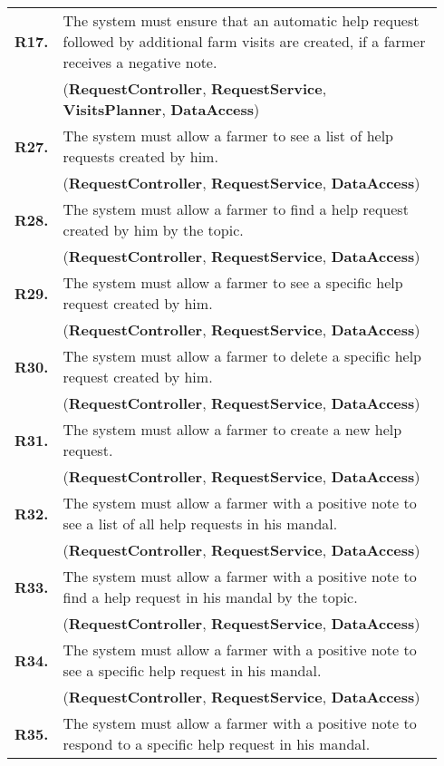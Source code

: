 \begin{longtable}{p{0.06\linewidth} p{0.88\linewidth}}
    \textbf{R17.} & The system must ensure that an automatic help request followed by additional farm visits are created, if a farmer receives a negative note.\\
    & (\textbf{RequestController}, \textbf{RequestService},
    \textbf{VisitsPlanner},
    \textbf{DataAccess})\\
	
	\textbf{R27.} & The system must allow a farmer to see a list of help requests created by him.\\
	& (\textbf{RequestController}, \textbf{RequestService}, \textbf{DataAccess})\\
	\textbf{R28.} & The system must allow a farmer to find a help request created by him by the topic.\\
	& (\textbf{RequestController}, \textbf{RequestService}, \textbf{DataAccess})\\
	\textbf{R29.} & The system must allow a farmer to see a specific help request created by him.\\
	& (\textbf{RequestController}, \textbf{RequestService}, \textbf{DataAccess})\\
	\textbf{R30.} & The system must allow a farmer to delete a specific help request created by him.\\
	& (\textbf{RequestController}, \textbf{RequestService}, \textbf{DataAccess})\\
	\textbf{R31.} & The system must allow a farmer to create a new help request.\\
	& (\textbf{RequestController}, \textbf{RequestService}, \textbf{DataAccess})\\
	\textbf{R32.} & The system must allow a farmer with a positive note to see a list of all help requests in his mandal.\\
	& (\textbf{RequestController}, \textbf{RequestService}, \textbf{DataAccess})\\
	\textbf{R33.} & The system must allow a farmer with a positive note to find a help request in his mandal by the topic.\\
	& (\textbf{RequestController}, \textbf{RequestService}, \textbf{DataAccess})\\
	\textbf{R34.} & The system must allow a farmer with a positive note to see a specific help request in his mandal.\\
	& (\textbf{RequestController}, \textbf{RequestService}, \textbf{DataAccess})\\
	\textbf{R35.} & The system must allow a farmer with a positive note to respond to a specific help request in his mandal.\\

\end{longtable}
